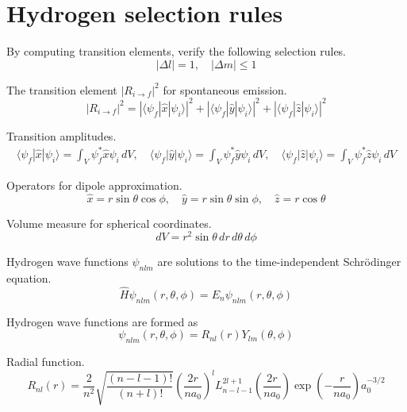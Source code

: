 

\section*{Hydrogen selection rules}

By computing transition elements, verify the following selection rules.
\begin{equation*}
|\Delta l|=1,\quad|\Delta m|\le1
\end{equation*}

The transition element $|R_{i\rightarrow f}|^2$ for spontaneous emission.
\begin{equation*}
|R_{i\rightarrow f}|^2
=|\langle\psi_f|\hat x|\psi_i\rangle|^2
+|\langle\psi_f|\hat y|\psi_i\rangle|^2
+|\langle\psi_f|\hat z|\psi_i\rangle|^2
\end{equation*}

Transition amplitudes.
\begin{gather*}
\langle\psi_f|\hat x|\psi_i\rangle
=\int_V\psi_f^*\hat x\psi_i\,dV,
\quad
\langle\psi_f|\hat y|\psi_i\rangle
=\int_V\psi_f^*\hat y\psi_i\,dV,
\quad
\langle\psi_f|\hat z|\psi_i\rangle
=\int_V\psi_f^*\hat z\psi_i\,dV
\end{gather*}

Operators for dipole approximation.
\begin{equation*}
\hat x=r\sin\theta\cos\phi,
\quad
\hat y=r\sin\theta\sin\phi,
\quad
\hat z=r\cos\theta
\end{equation*}

Volume measure for spherical coordinates.
\begin{equation*}
dV=r^2\sin\theta\,dr\,d\theta\,d\phi
\end{equation*}

Hydrogen wave functions $\psi_{nlm}$ are solutions to
the time-independent Schr\"odinger equation.
\begin{equation*}
\hat H\psi_{nlm}(r,\theta,\phi)=E_n\psi_{nlm}(r,\theta,\phi)
\end{equation*}

Hydrogen wave functions are formed as
\begin{equation*}
\psi_{nlm}(r,\theta,\phi)=R_{nl}(r)Y_{lm}(\theta,\phi)
\end{equation*}

Radial function.
\begin{equation*}
R_{nl}(r)=
\frac{2}{n^2}
\sqrt{\frac{(n-l-1)!}{(n+l)!}}
\left(\frac{2r}{na_0}\right)^l
L_{n-l-1}^{2l+1}\left(\frac{2r}{na_0}\right)
\exp\left(-\frac{r}{na_0}\right)
a_0^{-3/2}
\end{equation*}

